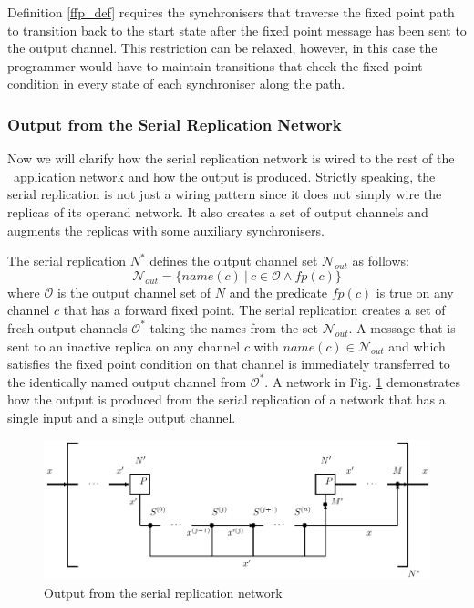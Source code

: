 Definition \ref{ffp_def} requires the synchronisers that traverse the fixed point path to transition back to the start state after the fixed point message has been sent to the output channel. This restriction can be relaxed, however, in this case the programmer would have to maintain transitions that check the fixed point condition in every state of each synchroniser along the path.


    \subsubsection*{Output from the Serial Replication Network}
Now we will clarify how the serial replication network is wired to the rest of the \ak\ application network and how the output is produced. Strictly speaking, the serial replication is not just a wiring pattern since it does not simply wire the replicas of its operand network. It also creates a set of output channels and augments the replicas with some auxiliary synchronisers.

The serial replication $N^{*}$ defines the output channel set $\mathcal{N}_{out}$ as follows:
\begin{equation}
\mathcal{N}_{out} = \{ name(c) \: | \: c \in \mathcal{O} \land fp(c) \}\nonumber
\end{equation}
where $\mathcal{O}$ is the output channel set of $N$ and the predicate $fp(c)$ is true on any channel $c$ that has a forward fixed point. The serial replication creates a set of fresh output channels $\mathcal{O}^{*}$ taking the names from the set $\mathcal{N}_{out}$. A message that is sent to an inactive replica on any channel $c$ with $name(c) \in \mathcal{N}_{out}$ and which satisfies the fixed point condition on that channel is immediately transferred to the identically named output channel from $\mathcal{O}^{*}$. A network in Fig. \ref{fig:ffp_out} demonstrates how the output is produced from the serial replication of a network that has a single input and a single output channel.

\begin{figure}[h!]
\centering
\includegraphics[scale=0.8]{figs/chapter_04_ffp_out.pdf}
\caption{Output from the serial replication network}
\label{fig:ffp_out}
\end{figure}


